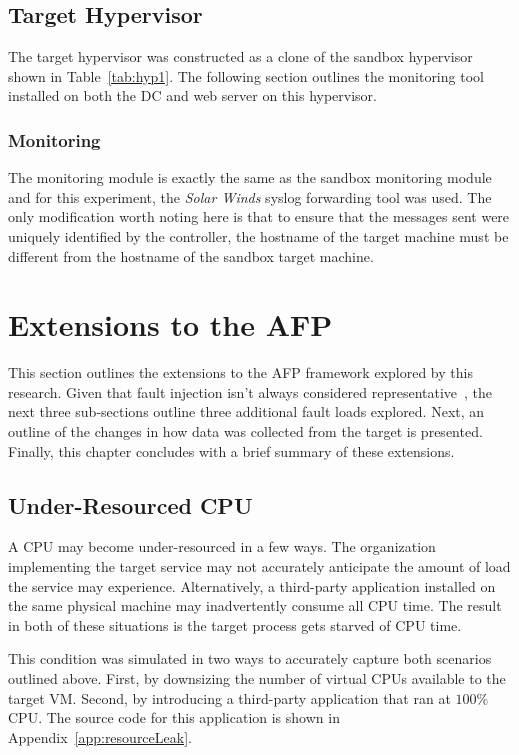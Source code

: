 \subsection{Target Hypervisor} \label{sec:target}
The target hypervisor was constructed as a clone of the sandbox hypervisor
shown in Table~\ref{tab:hyp1}.  The following section outlines the monitoring
tool installed on both the \ac{DC} and web server on this hypervisor.

\subsubsection{Monitoring} \label{sec:targetMonitoringTool}
The monitoring module is exactly the same as the sandbox monitoring module and
for this experiment, the \emph{Solar Winds} syslog forwarding tool was used.
The only modification worth noting here is that to ensure that the messages
sent were uniquely identified by the controller, the hostname of the target
machine must be different from the hostname of the sandbox target machine.

\setcounter{secnumdepth}{3}

\section{Extensions to the \ac{AFP}} \label{sec:extensions}
This section outlines the extensions to the \ac{AFP} framework explored by this
research.  Given that fault injection isn't always considered
representative~\cite{kikuchi2014}, the next three sub-sections outline three
additional fault loads explored.  Next, an outline of the changes in how data
was collected from the target is presented.  Finally, this chapter concludes
with a brief summary of these extensions.

\subsection{Under-Resourced \ac{CPU}} \label{sec:extUnderResourcedCPU}
A \ac{CPU} may become under-resourced in a few ways.  The organization
implementing the target service may not accurately anticipate the amount of
load the service may experience.  Alternatively, a third-party application
installed on the same physical machine may inadvertently consume all \ac{CPU}
time.  The result in both of these situations is the target process gets
starved of \ac{CPU} time.

This condition was simulated in two ways to accurately capture both scenarios
outlined above.  First, by downsizing the number of virtual \ac{CPU}s available
to the target \ac{VM}.  Second, by introducing a third-party application that
ran at $100\%$ \ac{CPU}.  The source code for this application is shown in
Appendix~\ref{app:resourceLeak}.


